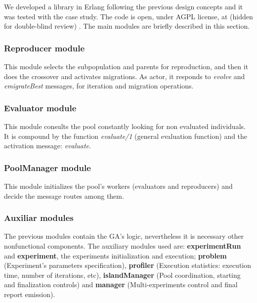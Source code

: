 
We developed a library in Erlang following the previous design concepts and it was tested with the case study. The code is open, under AGPL license, at %
(hidden for double-blind review)
. The main modules are briefly described in this section.

\subsubsection{Reproducer module}

This module selects the subpopulation and parents for reproduction, and then it does the crossover and activates migrations. As actor, it responds to {\em evolve} and {\em emigrateBest} messages, for iteration and migration operations.

\subsubsection{Evaluator module}

This module consults the pool constantly looking for non evaluated individuals. It is compound by the function {\em evaluate/1} (general evaluation function) and the activation message: {\em evaluate}.

\subsubsection{PoolManager module}

This module initializes the pool’s workers (evaluators and reproducers) and decide the message routes among them.

\subsubsection{Auxiliar modules}

The previous modules contain the GA’s logic, nevertheless it is necessary other nonfunctional components. The auxiliary modules used are: \textbf{experimentRun} and \textbf{experiment}, the experiments initialization and execution; \textbf{problem} (Experiment’s parameters specification), \textbf{profiler} (Execution statistics: execution time, number of iterations, etc), \textbf{islandManager} (Pool coordination, starting and finalization controls) and \textbf{manager} (Multi-experiments control and final report emission).

